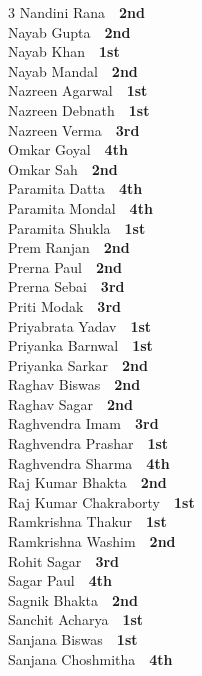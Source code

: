 \documentclass[11pt,a4paper]{article}
\begin{document}
\begin{multicols}{3}
Nandini Rana~\dotfill~\textbf{2nd}\\
Nayab Gupta~\dotfill~\textbf{2nd}\\
Nayab Khan~\dotfill~\textbf{1st}\\
Nayab Mandal~\dotfill~\textbf{2nd}\\
Nazreen Agarwal~\dotfill~\textbf{1st}\\
Nazreen Debnath~\dotfill~\textbf{1st}\\
Nazreen Verma~\dotfill~\textbf{3rd}\\
Omkar Goyal~\dotfill~\textbf{4th}\\
Omkar Sah~\dotfill~\textbf{2nd}\\
Paramita Datta~\dotfill~\textbf{4th}\\
Paramita Mondal~\dotfill~\textbf{4th}\\
Paramita Shukla~\dotfill~\textbf{1st}\\
Prem Ranjan~\dotfill~\textbf{2nd}\\
Prerna Paul~\dotfill~\textbf{2nd}\\
Prerna Sebai~\dotfill~\textbf{3rd}\\
Priti Modak~\dotfill~\textbf{3rd}\\
Priyabrata Yadav~\dotfill~\textbf{1st}\\
Priyanka Barnwal~\dotfill~\textbf{1st}\\
Priyanka Sarkar~\dotfill~\textbf{2nd}\\
Raghav Biswas~\dotfill~\textbf{2nd}\\
Raghav Sagar~\dotfill~\textbf{2nd}\\
Raghvendra Imam~\dotfill~\textbf{3rd}\\
Raghvendra Prashar~\dotfill~\textbf{1st}\\
Raghvendra Sharma~\dotfill~\textbf{4th}\\
Raj Kumar Bhakta~\dotfill~\textbf{2nd}\\
Raj Kumar Chakraborty~\dotfill~\textbf{1st}\\
Ramkrishna Thakur~\dotfill~\textbf{1st}\\
Ramkrishna Washim~\dotfill~\textbf{2nd}\\
Rohit Sagar~\dotfill~\textbf{3rd}\\
Sagar Paul~\dotfill~\textbf{4th}\\
Sagnik Bhakta~\dotfill~\textbf{2nd}\\
Sanchit Acharya~\dotfill~\textbf{1st}\\
Sanjana Biswas~\dotfill~\textbf{1st}\\
Sanjana Choshmitha~\dotfill~\textbf{4th}\\

\end{multicols}
\end{document}
